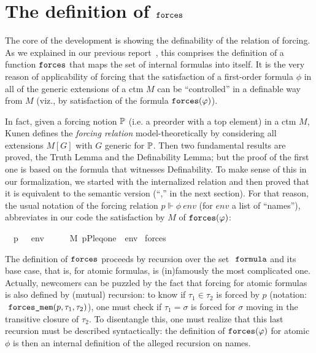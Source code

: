 \section{The definition of $\mathop{\mathtt{forces}}$}
\label{sec:definition-forces}

The core of the development is showing the definability of the
relation of forcing. As we explained in our previous
report~\cite[Sect.~8]{2019arXiv190103313G}, this comprises the
definition of a function $\mathop{\mathtt{forces}}$ that maps the set of internal
formulas into itself. It is the very reason of applicability of
forcing that the satisfaction of a first-order formula $\phi$ in all
of the generic extensions of a ctm $M$ can be ``controlled'' in a
definable way from $M$ (viz., by satisfaction of the formula
$\mathop{\mathtt{forces}}(\varphi)$).

In fact, given a forcing notion $\mathbb{P}$ (i.e. a preorder with a top element)
in a ctm $M$,
Kunen defines the \emph{forcing relation} model-theoretically 
by considering all extensions $M[G]$ with $G$ generic for $\mathbb{P}$.
Then two fundamental results are proved, the Truth Lemma and the
Definability Lemma; but the proof of the first one is based on the
formula that witnesses Definability. To make sense of this in our 
formalization, we started with the internalized relation and then
proved that it is equivalent to the semantic version 
(``,'' in
the next section).
For that reason, the usual notation of the forcing relation 
$p \Vdash \phi\ \mathit{env}$ (for $\mathit{env}$ a list of
``names''), abbreviates in our code the
satisfaction by $M$ of $\mathop{\mathtt{forces}}(\varphi)$:
\begin{isabelle}
\ \ {\isachardoublequoteopen}p\ {\isasymtturnstile}\ {\isasymphi}\ env\ \ \ {\isasymequiv}\ \ \ M{\isacharcomma}\ {\isacharparenleft}{\isacharbrackleft}p{\isacharcomma}P{\isacharcomma}leq{\isacharcomma}one{\isacharbrackright}\ {\isacharat}\ env{\isacharparenright}
    {\isasymTurnstile}\ forces{\isacharparenleft}{\isasymphi}{\isacharparenright}{\isachardoublequoteclose}
\end{isabelle}

The definition of $\mathop{\mathtt{forces}}$ proceeds by recursion
over the set $\formula$ and its base case, that is, for
atomic formulas, is (in)famously the most complicated one. Actually,
newcomers can be puzzled by the fact that forcing for atomic
formulas is also defined by (mutual) recursion: to know if $\tau_1\in\tau_2$ is
forced by $p$ (notation: $\forcesmem(p,\tau_1,\tau_2)$), one must check if $\tau_1=\sigma$ is forced for $\sigma$
moving in the transitive closure of $\tau_2$. To disentangle this, one
must realize that this last recursion must be described syntactically:
the definition of $\mathop{\mathtt{forces}}(\varphi)$ for atomic $\phi$ is then an
internal definition of the alleged recursion on names. 

